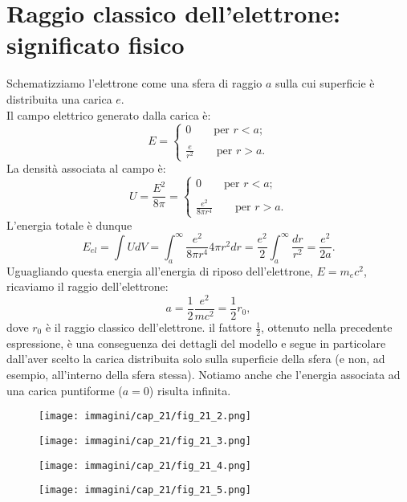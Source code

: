 \section[Raggio classico dell'elettrone]{Raggio classico dell'elettrone: significato fisico}
Schematizziamo l'elettrone come una sfera di raggio $a$ sulla cui superficie è distribuita una carica $e$.\\

Il campo elettrico generato dalla carica è:
\begin{equation}
E=\begin{cases}
0 \qquad \textrm{per }r<a;\\
\\
\displaystyle{\frac{e}{r^2}} \qquad \textrm{per }r>a.
\end{cases}
\end{equation}
La densità associata al campo è:
\begin{equation}
U=\frac{E^2}{8\pi}=\begin{cases}
0 \qquad \textrm{per }r<a;\\
\\
\displaystyle{\frac{e^2}{8\pi r^4}} \qquad \textrm{per }r>a.
\end{cases}
\end{equation}
L'energia totale è dunque
\begin{equation}
E_{el}=\int U dV = \int _a ^{\infty} \frac{e^2}{8\pi r^4} 4\pi r^2 dr = \frac{e^2}{2} \int _a ^{\infty} \frac{dr}{r^2}=\frac{e^2}{2a}. 
\end{equation}
Uguagliando questa energia all'energia di riposo dell'elettrone, $E=m_e c^2$, ricaviamo il raggio dell'elettrone:
\begin{equation}
a=\frac{1}{2}\frac{e^2}{mc^2}=\frac{1}{2} r_0,
\end{equation}
dove $r_0$ è il raggio classico dell'elettrone. il fattore $\frac{1}{2}$, ottenuto nella precedente espressione, è una conseguenza dei dettagli del modello e segue in particolare dall'aver scelto la carica distribuita solo sulla superficie della sfera (e non, ad esempio, all'interno della sfera stessa). Notiamo anche che l'energia associata ad una carica puntiforme ($a=0$) risulta infinita.
\begin{figure}[!htbp]
\begin{center}
\texttt{[image: immagini/cap\_21/fig\_21\_2.png]}\\
\end{center}
\end{figure}
\begin{figure}[!htbp]
\begin{center}
\texttt{[image: immagini/cap\_21/fig\_21\_3.png]}\\
\end{center}
\end{figure}
\begin{figure}[!htbp]
\begin{center}
\texttt{[image: immagini/cap\_21/fig\_21\_4.png]}\\
\end{center}
\end{figure}
\begin{figure}[!htbp]
\begin{center}
\texttt{[image: immagini/cap\_21/fig\_21\_5.png]}
\end{center}
\end{figure}
